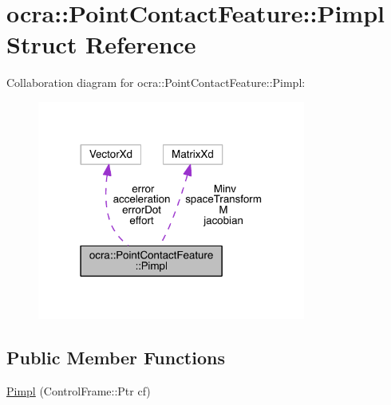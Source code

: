 \hypertarget{structocra_1_1PointContactFeature_1_1Pimpl}{}\section{ocra\+:\+:Point\+Contact\+Feature\+:\+:Pimpl Struct Reference}
\label{structocra_1_1PointContactFeature_1_1Pimpl}


Collaboration diagram for ocra\+:\+:Point\+Contact\+Feature\+:\+:Pimpl\+:\nopagebreak
\begin{figure}[H]
\begin{center}
\leavevmode
\includegraphics[width=250pt]{d0/dfa/structocra_1_1PointContactFeature_1_1Pimpl__coll__graph}
\end{center}
\end{figure}
\subsection*{Public Member Functions}
\begin{DoxyCompactItemize}
\item 
\hyperlink{structocra_1_1PointContactFeature_1_1Pimpl_aee2b366b499152deb1659571bb621ac8}{Pimpl} (Control\+Frame\+::\+Ptr cf)
\end{DoxyCompactItemize}
